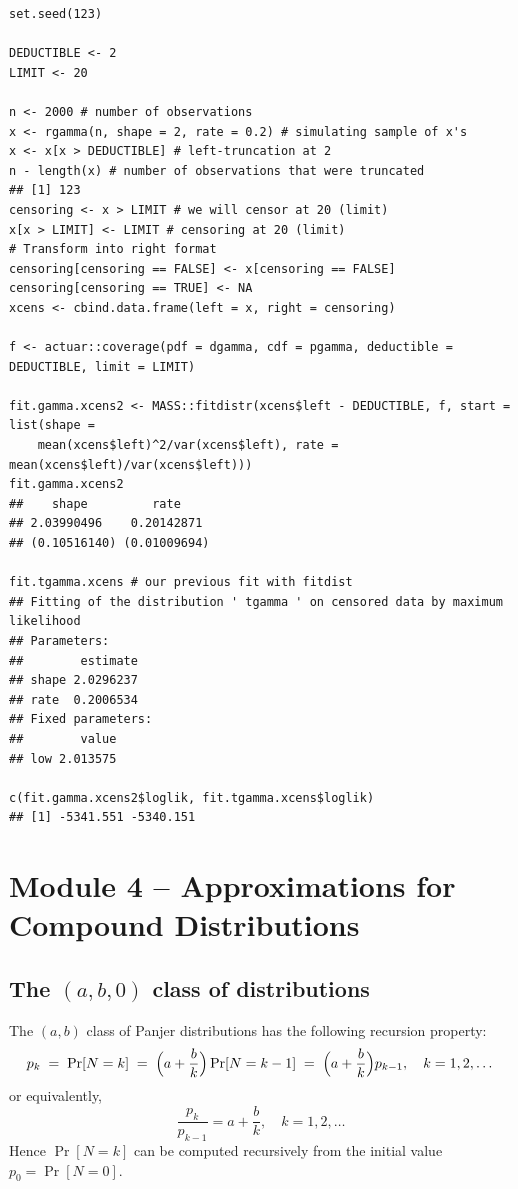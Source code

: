\documentclass[11pt]{article}
\newcommand{\noi}{\noindent}
\begin{document}
\begin{lstlisting}
set.seed(123)

DEDUCTIBLE <- 2
LIMIT <- 20

n <- 2000 # number of observations
x <- rgamma(n, shape = 2, rate = 0.2) # simulating sample of x's
x <- x[x > DEDUCTIBLE] # left-truncation at 2
n - length(x) # number of observations that were truncated
## [1] 123
censoring <- x > LIMIT # we will censor at 20 (limit)
x[x > LIMIT] <- LIMIT # censoring at 20 (limit)
# Transform into right format
censoring[censoring == FALSE] <- x[censoring == FALSE]
censoring[censoring == TRUE] <- NA
xcens <- cbind.data.frame(left = x, right = censoring)

f <- actuar::coverage(pdf = dgamma, cdf = pgamma, deductible = DEDUCTIBLE, limit = LIMIT)

fit.gamma.xcens2 <- MASS::fitdistr(xcens$left - DEDUCTIBLE, f, start = list(shape =
    mean(xcens$left)^2/var(xcens$left), rate = mean(xcens$left)/var(xcens$left)))
fit.gamma.xcens2
##    shape         rate
## 2.03990496    0.20142871
## (0.10516140) (0.01009694)

fit.tgamma.xcens # our previous fit with fitdist
## Fitting of the distribution ' tgamma ' on censored data by maximum likelihood
## Parameters:
##        estimate
## shape 2.0296237
## rate  0.2006534
## Fixed parameters:
##        value
## low 2.013575

c(fit.gamma.xcens2$loglik, fit.tgamma.xcens$loglik)
## [1] -5341.551 -5340.151
\end{lstlisting}












\newpage
\section{Module 4 – Approximations for Compound Distributions}

\subsection{The \((a,b,0)\) class of distributions}
\noi The \((a,b)\) class of Panjer distributions has the following recursion property:
\[
p_k \;=\;\Pr[N=k]
\;=\;\Bigl(a+\frac{b}{k}\Bigr)\Pr[N=k-1]
\;=\;\Bigl(a+\frac{b}{k}\Bigr)p_{k-1},
\quad k=1,2,\dots
\]
or equivalently,
\[
\frac{p_k}{p_{k-1}}
= a+\frac{b}{k},
\quad k=1,2,\dots
\]
\noi Hence \(\Pr[N=k]\) can be computed recursively from the initial value \(p_0=\Pr[N=0]\).
\end{document}
